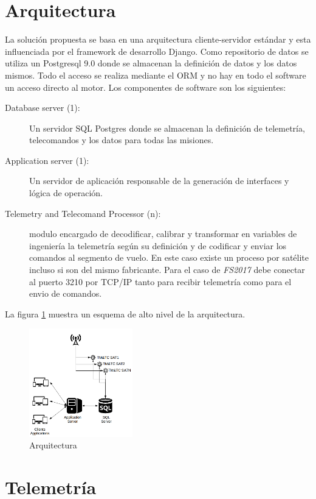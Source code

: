\documentclass[twoside,twocolumn]{article}
\begin{document}
\section{Arquitectura}
La solución propuesta se basa en una arquitectura cliente-servidor estándar y esta influenciada por el framework de desarrollo Django. Como repositorio de datos se utiliza un Postgresql 9.0 donde se almacenan la definición de datos y los datos mismos. Todo el acceso se realiza mediante el ORM y no hay en todo el software un acceso directo al motor. Los componentes de software son los siguientes:

\begin{description}
 \item [Database server (1): ] Un servidor SQL Postgres donde se almacenan la definición de telemetría, telecomandos y los datos para todas las misiones.  
 \item [Application server (1): ] Un servidor de aplicación responsable de la generación de interfaces y lógica de operación.
 \item [Telemetry and Telecomand Processor (n): ] modulo encargado de decodificar, calibrar y transformar en variables de ingeniería la telemetría según su definición y de codificar y enviar los comandos al segmento de vuelo. En este caso existe un proceso por satélite incluso si son del mismo fabricante. Para el caso de \textit{FS2017} debe conectar al puerto 3210 por TCP/IP tanto para recibir telemetría como para el envio de comandos.
\end{description}

La figura \ref{fig:Arq01} muestra un esquema de alto nivel de la arquitectura.

\begin{figure}[]
  \caption{Arquitectura}
  \label{fig:Arq01}
  \centering
  \includegraphics[width=0.4\textwidth]{Imagenes/Arq01.png}
\end{figure}


\section{Telemetría}
\label{sec:telemetria}
\end{document}
